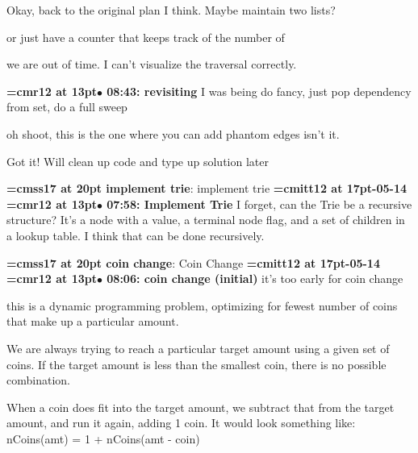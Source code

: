 Okay, back to the original plan I think. Maybe maintain two lists?
\par

or just have a counter that keeps track of the number of
\par

we are out of time. I can't visualize the traversal correctly.
\par

{\smallskip\noindent\bf\font\titlefont=cmr12 at 13pt\titlefont $\bullet$ 08:43: revisiting}\smallskip
I was being do fancy, just pop dependency from set, do a full sweep
\par

oh shoot, this is the one where you can add phantom edges isn't it.
\par

Got it! Will clean up code and type up solution later
\par

{\medskip\noindent\bf\font\titlefont=cmss17 at 20pt implement trie}: implement trie
{\medskip\noindent\bf\font\titlefont=cmitt12 at 17pt-05-14}\medskip
{\smallskip\noindent\bf\font\titlefont=cmr12 at 13pt\titlefont $\bullet$ 07:58: Implement Trie}\smallskip
I forget, can the Trie be a recursive structure? It's a node with a value, a terminal node flag, and a set of children in a lookup table. I think that can be done recursively.
\par

{\medskip\noindent\bf\font\titlefont=cmss17 at 20pt coin change}: Coin Change
{\medskip\noindent\bf\font\titlefont=cmitt12 at 17pt-05-14}\medskip
{\smallskip\noindent\bf\font\titlefont=cmr12 at 13pt\titlefont $\bullet$ 08:06: coin change (initial)}\smallskip
it's too early for coin change
\par

this is a dynamic programming problem, optimizing for fewest number of coins that make up a particular amount.
\par

We are always trying to reach a particular target amount using a given set of coins. If the target amount is less than the smallest coin, there is no possible combination.
\par

When a coin does fit into the target amount, we subtract that from the target amount, and run it again, adding 1 coin. It would look something like: nCoins(amt) = 1 + nCoins(amt - coin)
\par

